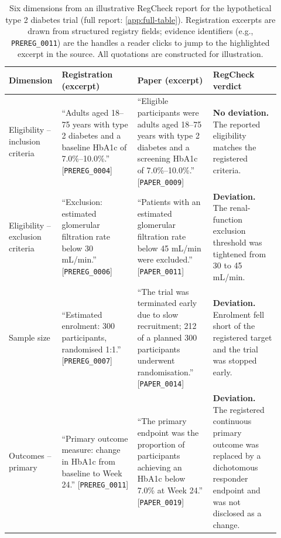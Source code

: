 \documentclass{article}
\begin{document}
\begin{table}[t]
  \centering
  \caption{Six dimensions from an illustrative RegCheck report for the
  hypothetical type 2 diabetes trial (full report:
  \cref{app:full-table}). Registration excerpts are drawn from structured
  registry fields; evidence identifiers (e.g., \texttt{PREREG\_0011}) are the
  handles a reader clicks to jump to the highlighted excerpt in the source. All
  quotations are constructed for illustration.}
  \label{tab:worked-example}
  \footnotesize
  \begin{tabular}{@{}p{0.14\linewidth}p{0.27\linewidth}p{0.27\linewidth}p{0.24\linewidth}@{}}
    \toprule
    \textbf{Dimension} & \textbf{Registration (excerpt)} & \textbf{Paper
    (excerpt)} & \textbf{RegCheck verdict} \\
    \midrule
    Eligibility -- inclusion criteria &
    ``Adults aged 18--75 years with type 2 diabetes and a baseline HbA1c of
    7.0\%--10.0\%.'' [\texttt{PREREG\_0004}] &
    ``Eligible participants were adults aged 18--75 years with type 2 diabetes
    and a screening HbA1c of 7.0\%--10.0\%.'' [\texttt{PAPER\_0009}] &
    \textbf{No deviation.} The reported eligibility matches the registered
    criteria. \\
    \addlinespace[3pt]
    Eligibility -- exclusion criteria &
    ``Exclusion: estimated glomerular filtration rate below 30 mL/min.''
    [\texttt{PREREG\_0006}] &
    ``Patients with an estimated glomerular filtration rate below 45 mL/min
    were excluded.'' [\texttt{PAPER\_0011}] &
    \textbf{Deviation.} The renal-function exclusion threshold was tightened
    from 30 to 45 mL/min. \\
    \addlinespace[3pt]
    Sample size &
    ``Estimated enrolment: 300 participants, randomised 1:1.''
    [\texttt{PREREG\_0007}] &
    ``The trial was terminated early due to slow recruitment; 212 of a planned
    300 participants underwent randomisation.'' [\texttt{PAPER\_0014}] &
    \textbf{Deviation.} Enrolment fell short of the registered target and the
    trial was stopped early. \\
    \addlinespace[3pt]
    Outcomes -- primary &
    ``Primary outcome measure: change in HbA1c from baseline to Week 24.''
    [\texttt{PREREG\_0011}] &
    ``The primary endpoint was the proportion of participants achieving an
    HbA1c below 7.0\% at Week 24.'' [\texttt{PAPER\_0019}] &
    \textbf{Deviation.} The registered continuous primary outcome was replaced
    by a dichotomous responder endpoint and was not disclosed as a change. \\

\end{tabular}
\end{table}
\end{document}
